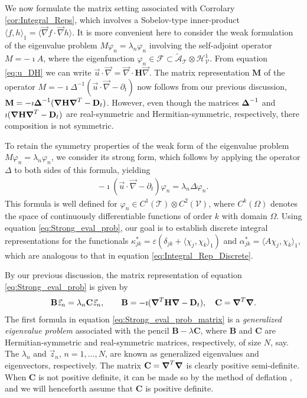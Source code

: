 \documentclass[11pt]{amsart}
\newcommand{\Mb}{\mathbf{M}}
\newcommand{\Hb}{\mathbf{H}}
\newcommand{\Bb}{\mathbf{B}}
\newcommand{\Cb}{\mathbf{C}}
\newcommand{\Db}{\mathbf{D}}
\newcommand{\Tc}{\mathcal{T}}
\newcommand{\Vc}{\mathcal{V}}
\newcommand{\Hc}{\mathcal{H}}
\newcommand{\Fc}{\mathcal{F}}
\newcommand{\As}{\mathscr{A}}
\newcommand\bDelta{\mbox{\boldmath${\Delta}$}}
\newcommand\Bnabla{\mbox{\boldmath${\nabla}$}}
\begin{document}
We now formulate the matrix setting associated with Corrolary
\ref{cor:Integral_Reps}, which involves a Sobelov-type inner-product 
$\langle f,h\rangle_1=\langle\vec{\nabla}f\cdot\vec{\nabla}h\rangle$. It is more convenient here to consider
the weak formulation of the eigenvalue problem $M\varphi_n=\lambda_n\varphi_n$
involving the self-adjoint operator $M=-\imath A$, where the eigenfunction
$\varphi_n\in\Fc\subset\tilde{\As}_{\Tc}\otimes\Hc^1_{\Vc}$. From equation \eqref{eq:u_DH}
we can write $\vec{u}\cdot\vec{\nabla}=\vec{\nabla}\cdot\Hb\vec{\nabla}$. The matrix
representation $\Mb$ of the operator $M=-\imath\Delta^{-1}(\vec{u}\cdot\vec{\nabla}-\partial_t)$
now follows from our previous discussion,
$\Mb=-\imath\bDelta^{-1}(\Bnabla\Hb\Bnabla^T-\Db_t)$. However, even though
the matrices $\bDelta^{-1}$ and $\imath(\Bnabla\Hb\Bnabla^T-\Db_t)$ are
real-symmetric and Hermitian-symmetric, respectively, there
composition is not symmetric. 




To retain the symmetry properties of the weak form of the eigenvalue 
problem $M\varphi_n=\lambda_n\varphi_n$, we consider its strong form, which follows by
applying the operator $\Delta$ to both sides of this formula, yielding  
%
\begin{align}\label{eq:Strong_eval_prob}
  -\imath(\vec{u}\cdot\vec{\nabla}-\partial_t)\varphi_n=\lambda_n\Delta\varphi_n.
\end{align}
%
This formula is well defined for $\varphi_n\in C^1(\Tc)\otimes C^2(\Vc)$, where $C^k(\Omega)$
denotes the space of continuously differentiable functions of order
$k$ with domain $\Omega$. Using equation \eqref{eq:Strong_eval_prob}, our
goal is to establish discrete integral representations for the functionals
$\kappa^*_{jk}=\varepsilon(\delta_{jk}+\langle\chi_j,\chi_k\rangle_1)$ and $\alpha^*_{jk}=\langle A\chi_j,\chi_k\rangle_1$, which
are analogous to that in equation
\eqref{eq:Integral_Rep_Discrete}. 
 



By our previous discussion, the matrix representation of equation
\eqref{eq:Strong_eval_prob} is given by
%
\begin{align}\label{eq:Strong_eval_prob_matrix}
  \Bb\vec{z}_n=\lambda_n\Cb\vec{z}_n, \qquad
  \Bb=-\imath(\Bnabla^T\Hb\Bnabla-\Db_t), \quad
  \Cb=\Bnabla^T\Bnabla.
\end{align}
%
The first formula in equation \eqref{eq:Strong_eval_prob_matrix} is a
\emph{generalized eigenvalue problem} \cite{Parlett:1980} associated
with the pencil $\Bb-\lambda\Cb$, where $\Bb$ and $\Cb$ are
Hermitian-symmetric and real-symmetric matrices, respectively, of size
$N$, say. The $\lambda_n$ and $\vec{z}_n$, $n=1,\ldots,N$, are known as
generalized eigenvalues and eigenvectors, respectively. The matrix
$\Cb=\Bnabla^T\Bnabla$ is clearly positive semi-definite. When $\Cb$
is not positive definite, it can be made so by the method of deflation
\cite{Parlett:1980}, and 
we will henceforth assume that $\Cb$ is positive definite.
\end{document}
